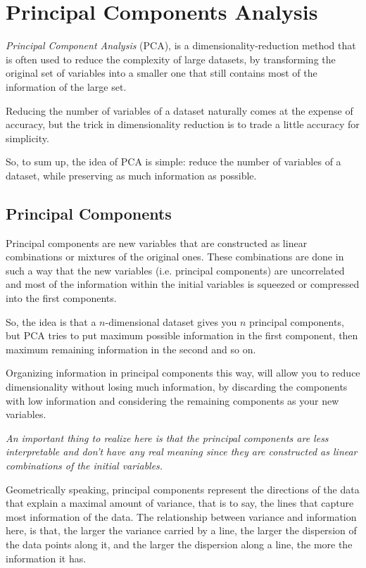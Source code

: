 \section{Principal Components Analysis}
\label{sec:pca}

\emph{Principal Component Analysis} (PCA), is a dimensionality-reduction method that is often used to reduce the complexity of large datasets, by transforming the original set of variables into a smaller one that still contains most of the information of the large set.

Reducing the number of variables of a dataset naturally comes at the expense of accuracy, but the trick in dimensionality reduction is to trade a little accuracy for simplicity. 

So, to sum up, the idea of PCA is simple: reduce the number of variables of a dataset, while preserving as much information as possible.

\subsection{Principal Components}

Principal components are new variables that are constructed as linear combinations or mixtures of the original ones. These combinations are done in such a way that the new variables (i.e. principal components) are uncorrelated and most of the information within the initial variables is squeezed or compressed into the first components. 

So, the idea is that a $n$-dimensional dataset gives you $n$ principal components, but PCA tries to put maximum possible information in the first component, then maximum remaining information in the second and so on.

Organizing information in principal components this way, will allow you to reduce dimensionality without losing much information, by discarding the components with low information and considering the remaining components as your new variables.

\emph{An important thing to realize here is that the principal components are less interpretable and don’t have any real meaning since they are constructed as linear combinations of the initial variables.}

Geometrically speaking, principal components represent the directions of the data that explain a maximal amount of variance, that is to say, the lines that capture most information of the data. The relationship between variance and information here, is that, the larger the variance carried by a line, the larger the dispersion of the data points along it, and the larger the dispersion along a line, the more the information it has.

